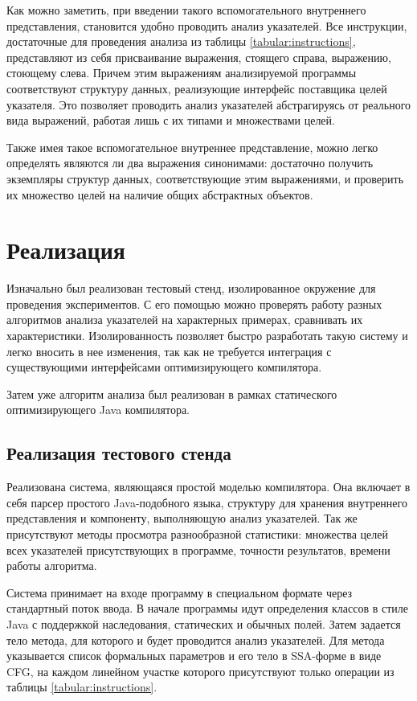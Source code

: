 \documentclass[14pt,titlepage]{extarticle}
\let\oldsection\section
\renewcommand{\section}{\newpage\oldsection}
\begin{document}
    Как можно заметить, при введении такого вспомогательного внутреннего
    представления, становится удобно проводить анализ указателей.
    Все инструкции, достаточные для проведения анализа из таблицы
    \ref{tabular:instructions}, представляют из себя присваивание выражения,
    стоящего справа, выражению, стоющему слева. Причем этим выражениям
    анализируемой программы соответствуют структуру данных, реализующие интерфейс
    поставщика целей указателя. Это позволяет проводить анализ указателей
    абстрагируясь от реального вида выражений, работая лишь с их типами и
    множествами целей.

    Также имея такое вспомогательное внутреннее представление, можно легко
    определять являются ли два выражения синонимами: достаточно получить
    экземпляры структур данных, соответствующие этим выражениями, и проверить
    их множество целей на наличие общих абстрактных объектов.


  \section{Реализация}

    Изначально был реализован тестовый стенд, изолированное окружение для
    проведения экспериментов. С его помощью можно проверять работу
    разных алгоритмов анализа указателей на характерных примерах, сравнивать их
    характеристики. Изолированность позволяет быстро разработать такую систему
    и легко вносить в нее изменения, так как не требуется интеграция с
    существующими интерфейсами оптимизирующего компилятора.

    Затем уже алгоритм анализа был реализован в рамках статического
    оптимизирующего Java компилятора.

    \subsection{Реализация тестового стенда}

      Реализована система, являющаяся простой моделью компилятора. Она включает
      в себя парсер простого Java-подобного языка, структуру для хранения
      внутреннего представления и компоненту, выполняющую анализ указателей.
      Так же присутствуют методы просмотра разнообразной статистики: множества
      целей всех указателей присутствующих в программе, точности результатов,
      времени работы алгоритма.

      Система принимает на входе программу в специальном формате через
      стандартный поток ввода. В начале программы идут определения классов в
      стиле Java с поддержкой наследования, статических и обычных полей. Затем
      задается тело метода, для которого и будет проводится анализ указателей.
      Для метода указывается список формальных параметров и его тело в
      SSA-форме в виде CFG, на каждом линейном участке которого присутствуют
      только операции из таблицы \ref{tabular:instructions}.
\end{document}
